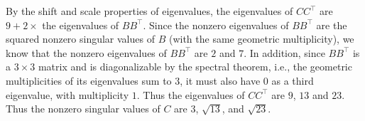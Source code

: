 \documentclass[10pt]{article}
\begin{document}
\begin{enumerate}[label=(\alph*)]
By the shift and scale properties of eigenvalues, the eigenvalues of $CC^\top$ are $9 + 2 \times$ the eigenvalues of $BB^\top$. Since the nonzero eigenvalues of $BB^\top$ are the squared nonzero singular values of $B$ (with the same geometric multiplicity), we know that the nonzero eigenvalues of $BB^\top$ are $2$ and $7$. In addition, since $BB^\top$ is a $3 \times 3$ matrix and is diagonalizable by the spectral theorem, i.e., the geometric multiplicities of its eigenvalues sum to $3$, it must also have $0$ as a third eigenvalue, with multiplicity $1$. Thus the eigenvalues of $CC^\top$ are $9$, $13$ and $23$. Thus the nonzero singular values of $C$ are $3$, $\sqrt{13}$, and $\sqrt{23}$.

\end{enumerate}
\end{document}
